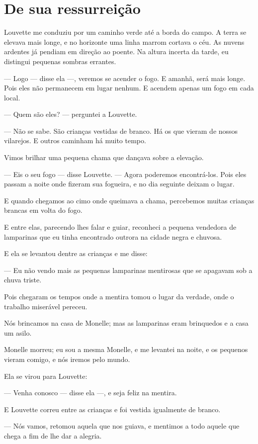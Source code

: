 \section{De sua ressurreição}

Louvette me conduziu por um caminho verde até a borda do campo. A terra
se elevava mais longe, e no horizonte uma linha marrom cortava o céu. As
nuvens ardentes já pendiam em direção ao poente. Na altura incerta da
tarde, eu distingui pequenas sombras errantes.

--- Logo --- disse ela ---, veremos se acender o fogo. E amanhã, será mais
longe. Pois eles não permanecem em lugar nenhum. E acendem apenas um
fogo em cada local.

--- Quem são eles? --- perguntei a Louvette.

--- Não se sabe. São crianças vestidas de branco. Há os que vieram de
nossos vilarejos. E outros caminham há muito tempo.

Vimos brilhar uma pequena chama que dançava sobre a elevação.

--- Eis o seu fogo --- disse Louvette. --- Agora poderemos encontrá-los. Pois
eles passam a noite onde fizeram sua fogueira, e no dia seguinte deixam o
lugar.

E quando chegamos ao cimo onde queimava a chama, percebemos muitas
crianças brancas em volta do fogo.

E entre elas, parecendo lhes falar e guiar, reconheci a pequena
vendedora de lamparinas que eu tinha encontrado outrora na cidade negra e
chuvosa.

E ela se levantou dentre as crianças e me disse:

--- Eu não vendo mais as pequenas lamparinas mentirosas que se apagavam
sob a chuva triste.

Pois chegaram os tempos onde a mentira tomou o lugar da verdade, onde o
trabalho miserável pereceu.

Nós brincamos na casa de Monelle; mas as lamparinas eram brinquedos e a
casa um asilo.

Monelle morreu; eu sou a mesma Monelle, e me levantei na noite, e os
pequenos vieram comigo, e nós iremos pelo mundo.

Ela se virou para Louvette:

--- Venha conosco --- disse ela ---, e seja feliz na mentira.

E Louvette correu entre as crianças e foi vestida igualmente de branco.

--- Nós vamos, retomou aquela que nos guiava, e mentimos a todo aquele
que chega a fim de lhe dar a alegria.

